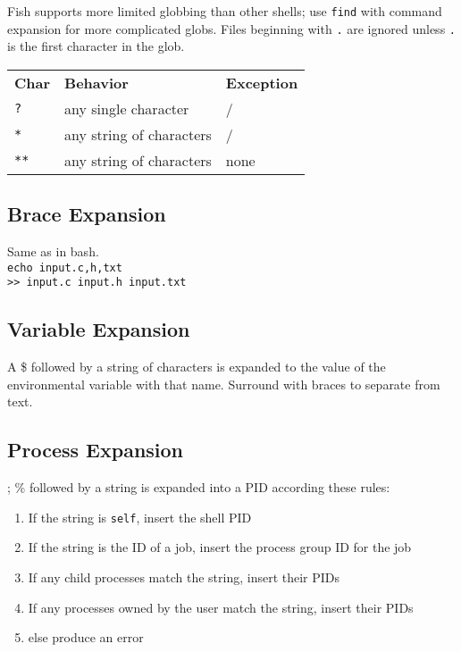 \documentclass[10pt]{extarticle}
\begin{document}
\begin{paracol}{2}
Fish supports more limited globbing than other shells; use \texttt{find} with command expansion for more complicated globs.
Files beginning with \texttt{.} are ignored unless \texttt{.} is the first character in the glob.

\begin{tabularx}{\columnwidth}{X X X}
    \rowcolor{DarkBackground}
    \textbf{Char} & \textbf{Behavior} & \textbf{Exception} \\
    \texttt{?} & any single character & / \\
    \texttt{*} & any string of characters & / \\
    \texttt{**} & any string of characters & none
\end{tabularx}

\subsection*{Brace Expansion}

Same as in bash.\\
\texttt{echo input.{c,h,txt}}\\
\texttt{>> input.c input.h input.txt}

\subsection*{Variable Expansion}

A \$ followed by a string of characters is expanded to the value of the environmental variable with that name.
Surround with braces to separate from text.

\subsection*{Process Expansion}

;
\% followed by a string is expanded into a PID according these rules:

\begin{enumerate}
    \item If the string is \texttt{self}, insert the shell PID
    \item If the string is the ID of a job, insert the process group ID for
        the job
    \item If any child processes match the string, insert their PIDs
    \item If any processes owned by the user match the string, insert their PIDs
    \item else produce an error
\end{enumerate}


\end{paracol}
\end{document}
